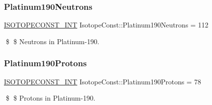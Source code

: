 \subsubsection{\texorpdfstring{Platinum190\+Neutrons}{Platinum190Neutrons}}
{\footnotesize\ttfamily \mbox{\hyperlink{group___isotope_const-_macros_ga5f18360b3e99483a35c32d789e62621c}{I\+S\+O\+T\+O\+P\+E\+C\+O\+N\+S\+T\+\_\+\+I\+NT}} Isotope\+Const\+::\+Platinum190\+Neutrons = 112}

\$ \$ Neutrons in Platinum-\/190. \mbox{\label{group___isotope_const-_platinum-_pt190_ga31ed68c6407bf0b32ac76bbbdb10fd17}} 
\subsubsection{\texorpdfstring{Platinum190\+Protons}{Platinum190Protons}}
{\footnotesize\ttfamily \mbox{\hyperlink{group___isotope_const-_macros_ga5f18360b3e99483a35c32d789e62621c}{I\+S\+O\+T\+O\+P\+E\+C\+O\+N\+S\+T\+\_\+\+I\+NT}} Isotope\+Const\+::\+Platinum190\+Protons = 78}

\$ \$ Protons in Platinum-\/190. 